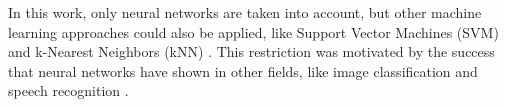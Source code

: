 In this work, only neural networks are taken into account, but other machine learning approaches could also be applied, like Support Vector Machines (SVM) {\color{red}\cite{fitzgerald_using_2012}} and k-Nearest Neighbors (kNN) {\color{red}\cite{axelsson_normalised_2010}}. This restriction was motivated by the success that neural networks have shown in other fields, like image classification {\color{red}\cite{matan_reading_1992}} and speech recognition {\color{red}\cite{graves_speech_2013}}.

